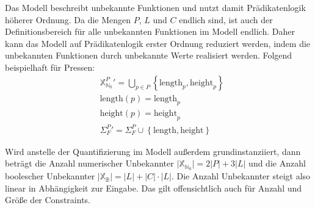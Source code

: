 Das Modell beschreibt unbekannte Funktionen und nutzt damit Prädikatenlogik höherer Ordnung.
Da die Mengen $P$, $L$ und $C$ endlich sind, ist auch der Definitionsbereich für alle unbekannten Funktionen im Modell endlich.
Daher kann das Modell auf Prädikatenlogik erster Ordnung reduziert werden, indem die unbekannten Funktionen durch unbekannte Werte realisiert werden.
Folgend beispielhaft für Pressen:
\begin{align*}
    &\hspace{0pt} \mathbb{X}_{\mathbb{N}_0}^{P}\prime = \bigcup_{p \in P} \left\{\text{length}_p, \text{height}_p\right\} \\
    &\hspace{0pt} \text{length}(p) = \text{length}_p \\
    &\hspace{0pt} \text{height}(p) = \text{height}_p \\
    &\hspace{0pt} \Sigma_{F}^{P}\prime = \Sigma_{F}^{P} \cup \left\{ \text{length}, \text{height} \right\}
\end{align*}

Wird anstelle der Quantifizierung im Modell außerdem grundinstanziiert, dann beträgt die Anzahl numerischer Unbekannter
$\lvert \mathbb{X}_{\mathbb{N}_0} \rvert = 2 \lvert P \rvert + 3 \lvert L \rvert$ und die Anzahl boolescher Unbekannter
$\lvert \mathbb{X}_{\mathbb{B}} \rvert = \lvert L \rvert + \lvert C \rvert \cdot \lvert L \rvert$.
Die Anzahl Unbekannter steigt also linear in Abhängigkeit zur Eingabe.
Das gilt offensichtlich auch für Anzahl und Größe der Constraints.

